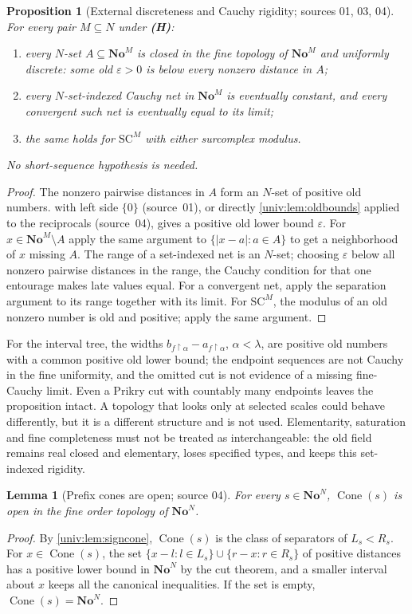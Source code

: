\documentclass[11pt,letterpaper]{article}
\numberwithin{equation}{section}
\newtheorem{lemma}[lemma]{Lemma}
\newtheorem{proposition}[proposition]{Proposition}
\theoremstyle{definition}
\theoremstyle{remark}
\newcommand{\No}{\mathbf{No}}
\newcommand{\SC}{\mathrm{SC}}
\newcommand{\NoM}{\No^{M}}
\newcommand{\NoN}{\No^{N}}
\newcommand{\SCM}{\SC^{M}}
\newcommand{\Cone}{\operatorname{Cone}}
\newcommand{\res}{\mathbin{\upharpoonright}}
\newcommand{\abs}[1]{\lvert#1\rvert}
\begin{document}
\begin{proposition}[External discreteness and Cauchy rigidity; sources 01, 03, 04]\label{univ:prop:topology}
For every pair $M\subseteq N$ under \textbf{(H)}:
\begin{enumerate}[label=\textnormal{(\roman*)}]
\item every $N$-set $A\subseteq\NoM$ is closed in the fine topology of $\NoM$ and
uniformly discrete: some old $\varepsilon>0$ is below every nonzero distance in
$A$;
\item every $N$-set-indexed Cauchy net in $\NoM$ is eventually constant, and
every convergent such net is eventually equal to its limit;
\item the same holds for $\SCM$ with either surcomplex modulus.
\end{enumerate}
No short-sequence hypothesis is needed.
\end{proposition}
\begin{proof}
The nonzero pairwise distances in $A$ form an $N$-set of positive old numbers.
 with left side $\{0\}$ (source~01), or directly
\cref{univ:lem:oldbounds} applied to the reciprocals (source~04), gives a
positive old lower bound $\varepsilon$. For $x\in\NoM\setminus A$ apply the same
argument to $\{\abs{x-a}:a\in A\}$ to get a neighborhood of $x$ missing $A$.
The range of a set-indexed net is an $N$-set; choosing $\varepsilon$ below all
nonzero pairwise distances in the range, the Cauchy condition for that one
entourage makes late values equal. For a convergent net, apply the separation
argument to its range together with its limit. For $\SCM$, the modulus of an
old nonzero number is old and positive; apply the same argument.
\end{proof}

For the interval tree, the widths $b_{f\res\alpha}-a_{f\res\alpha}$,
$\alpha<\lambda$, are positive old numbers with a common positive old lower
bound; the endpoint sequences are not Cauchy in the fine uniformity, and the
omitted cut is not evidence of a missing fine-Cauchy limit. Even a Prikry cut
with countably many endpoints leaves the proposition intact. A topology that
looks only at selected scales could behave differently, but it is a different
structure and is not used. Elementarity, saturation and fine completeness must
not be treated as interchangeable: the old field remains real closed and
elementary, loses specified types, and keeps this set-indexed rigidity.

\begin{lemma}[Prefix cones are open; source 04]\label{univ:lem:coneopen}
For every $s\in\NoN$, $\Cone(s)$ is open in the fine order topology of $\NoN$.
\end{lemma}
\begin{proof}
By \cref{univ:lem:signcone}, $\Cone(s)$ is the class of separators of
$L_s<R_s$. For $x\in\Cone(s)$, the set
$\{x-l:l\in L_s\}\cup\{r-x:r\in R_s\}$ of positive distances has a positive
lower bound in $\NoN$ by the cut theorem, and a smaller interval about $x$ keeps
all the canonical inequalities. If the set is empty, $\Cone(s)=\NoN$.
\end{proof}
\end{document}
